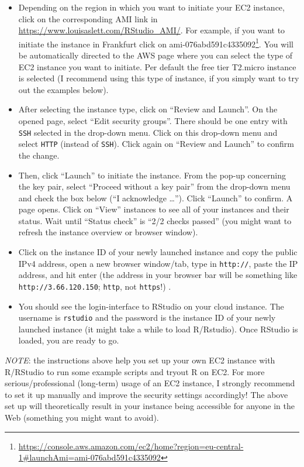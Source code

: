 \documentclass[
  12pt,
]{style/krantz}
\renewcommand{\href}[2]{#2\footnote{\url{#1}}}
\begin{document}
\begin{itemize}
\item
  Depending on the region in which you want to initiate your EC2 instance, click on the corresponding AMI link in \url{https://www.louisaslett.com/RStudio_AMI/}. For example, if you want to initiate the instance in Frankfurt click on \href{https://console.aws.amazon.com/ec2/home?region=eu-central-1\#launchAmi=ami-076abd591c4335092}{ami-076abd591c4335092}. You will be automatically directed to the AWS page where you can select the type of EC2 instance you want to initiate. Per default the free tier T2.micro instance is selected (I recommend using this type of instance, if you simply want to try out the examples below).
\item
  After selecting the instance type, click on ``Review and Launch''. On the opened page, select ``Edit security groups''. There should be one entry with \texttt{SSH} selected in the drop-down menu. Click on this drop-down menu and select \texttt{HTTP} (instead of \texttt{SSH}). Click again on ``Review and Launch'' to confirm the change.
\item
  Then, click ``Launch'' to initiate the instance. From the pop-up concerning the key pair, select ``Proceed without a key pair'' from the drop-down menu and check the box below (``I acknowledge \ldots{}''). Click ``Launch'' to confirm. A page opens. Click on ``View'' instances to see all of your instances and their status. Wait until ``Status check'' is ``2/2 checks passed'' (you might want to refresh the instance overview or browser window).
\item
  Click on the instance ID of your newly launched instance and copy the public IPv4 address, open a new browser window/tab, type in \texttt{http://}, paste the IP address, and hit enter (the address in your browser bar will be something like \texttt{http://3.66.120.150}; \texttt{http}, not \texttt{https}!) .
\item
  You should see the login-interface to RStudio on your cloud instance. The username is \texttt{rstudio} and the password is the instance ID of your newly launched instance (it might take a while to load R/Rstudio). Once RStudio is loaded, you are ready to go.
\end{itemize}

\emph{NOTE}: the instructions above help you set up your own EC2 instance with R/RStudio to run some example scripts and tryout R on EC2. For more serious/professional (long-term) usage of an EC2 instance, I strongly recommend to set it up manually and improve the security settings accordingly! The above set up will theoretically result in your instance being accessible for anyone in the Web (something you might want to avoid).
\end{document}

